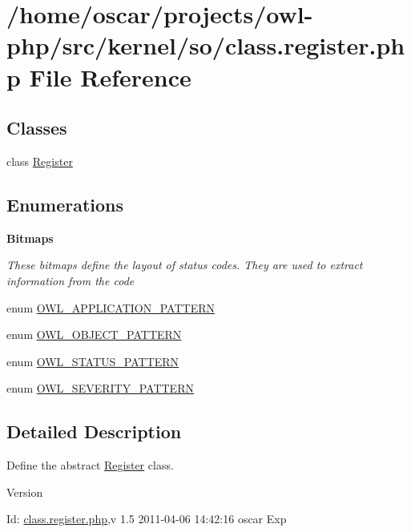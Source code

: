 \section{/home/oscar/projects/owl-\/php/src/kernel/so/class.register.php File Reference}
\label{class_8register_8php}
\subsection*{Classes}
\begin{DoxyCompactItemize}
\item 
class \hyperlink{classRegister}{Register}
\end{DoxyCompactItemize}
\subsection*{Enumerations}
\begin{Indent}{\bf Bitmaps}\par
{\em \label{_amgrp2ec9eef022a1b519bdb1040e05224b00}
 These bitmaps define the layout of status codes. They are used to extract information from the code }\begin{DoxyCompactItemize}
\item 
enum \hyperlink{class_8register_8php_a22359c406b8745e8fa2412ec96d5e74c}{OWL\_\-APPLICATION\_\-PATTERN} 
\item 
enum \hyperlink{class_8register_8php_aac5ed52fb1bbffdff69e9a24c40962f5}{OWL\_\-OBJECT\_\-PATTERN} 
\item 
enum \hyperlink{class_8register_8php_a0a8649e9ad7fa654df2c41aa4ba1283c}{OWL\_\-STATUS\_\-PATTERN} 
\item 
enum \hyperlink{class_8register_8php_aeb9363fcaa1cd911762ff88518a9d973}{OWL\_\-SEVERITY\_\-PATTERN} 
\end{DoxyCompactItemize}
\end{Indent}


\subsection{Detailed Description}
Define the abstract \hyperlink{classRegister}{Register} class. \begin{DoxyVersion}{Version}

\end{DoxyVersion}
\begin{DoxyParagraph}{Id:}
\hyperlink{class_8register_8php}{class.register.php},v 1.5 2011-\/04-\/06 14:42:16 oscar Exp 
\end{DoxyParagraph}



